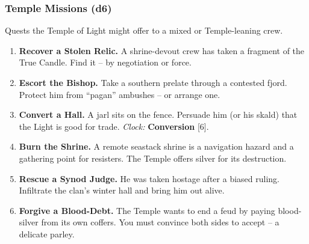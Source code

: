 \subsubsection*{Temple Missions (d6)}
Quests the Temple of Light might offer to a mixed or Temple-leaning crew.
\begin{enumerate}[label=\arabic*., wide=0pt]
    \item \textbf{Recover a Stolen Relic.} A shrine-devout crew has taken a fragment of the True Candle. Find it -- by negotiation or force.
    \item \textbf{Escort the Bishop.} Take a southern prelate through a contested fjord. Protect him from ``pagan'' ambushes -- or arrange one.
    \item \textbf{Convert a Hall.} A jarl sits on the fence. Persuade him (or his skald) that the Light is good for trade. \textit{Clock:} \textbf{Conversion} [6].
    \item \textbf{Burn the Shrine.} A remote seastack shrine is a navigation hazard and a gathering point for resisters. The Temple offers silver for its destruction.
    \item \textbf{Rescue a Synod Judge.} He was taken hostage after a biased ruling. Infiltrate the clan's winter hall and bring him out alive.
    \item \textbf{Forgive a Blood-Debt.} The Temple wants to end a feud by paying blood-silver from its own coffers. You must convince both sides to accept -- a delicate parley.
\end{enumerate}


